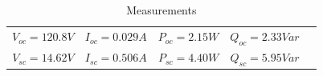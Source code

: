 \begin{table}[H]\centering
	\begin{threeparttable}
		\caption{Measurements}\label{tab:meas}
		\footnotesize
		\setlength{\tabcolsep}{4pt}
		\begin{tabular}{*{5}{r}}
			\midrule
			$V_{oc}=120.8V$ & $I_{oc}=0.029A$ & $P_{oc}=2.15W$ & $Q_{oc}=2.33Var$ \\
			$V_{sc}=14.62V$ & $I_{sc}=0.506A$ & $P_{sc}=4.40W$ & $Q_{sc}=5.95Var$ \\
			\bottomrule
		\end{tabular}
		\begin{tablenotes}\footnotesize
			\item
		\end{tablenotes}
	\end{threeparttable}
\end{table}
